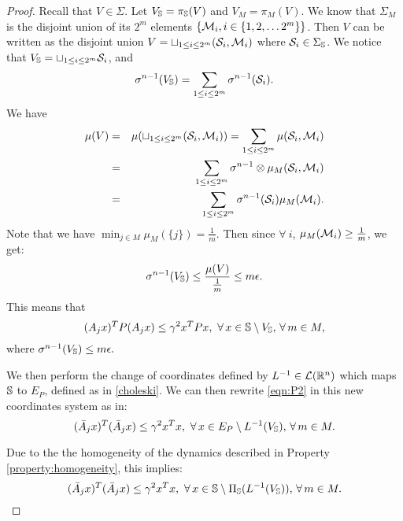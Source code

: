 \begin{proof}
Recall that $V \in \Sigma$. Let $V_{\mathbb{S}} = \pi_{\mathbb{S}}(V)$ and \mbox{$V_M = \pi_M (V)$}. We know that $\Sigma_M$ is the disjoint union of its $2^m$ elements $\{\mathcal{M}_i, i \in \{1,2, \ldots 2^m\} \}$. Then $V$ can be written as the disjoint union $V = \sqcup_{1 \leq i \leq 2^m} (\mathcal{S}_i, \mathcal{M}_i)$ where $\mathcal{S}_i \in \Sigma_{\mathbb{S}}$. We notice that 
$V_{\mathbb{S}} = \sqcup_{1 \leq i \leq 2^m} \mathcal{S}_i$, 
and
\begin{equation*}
\sigma^{n-1} (V_{\mathbb{S}}) = \sum_{1 \leq i \leq 2^m} \sigma^{n-1} (\mathcal{S}_i).
\end{equation*}
We have 
\begin{eqnarray*}
\mu(V) &=& \mu(\sqcup_{1 \leq i \leq 2^m} (\mathcal{S}_i, \mathcal{M}_i)) = \sum_{1 \leq i \leq 2^m} \mu(\mathcal{S}_i, \mathcal{M}_i) \\
 &=& \sum_{1 \leq i \leq 2^m} \sigma^{n-1} \otimes \mu_M (\mathcal{S}_i, \mathcal{M}_i) \\
 & = &\sum_{1 \leq i \leq 2^m} \sigma^{n-1}(\mathcal{S}_i) \mu_M (\mathcal{M}_i).
\end{eqnarray*}
Note that we have $\min_{j \in M} \mu_M(\{j\}) = \frac{1}{m}.$ Then since $ \forall \ i$, $\mu_M(\mathcal{M}_i) \geq \frac{1}{m}$, we get:
\begin{equation}
\sigma^{n-1}(V_{\mathbb{S}}) \leq \frac{\mu(V)}{\frac{1}{m}} \leq m \epsilon.
\end{equation}
This means that 
\begin{equation}\label{eqn:P2}(A_j x)^TP(A_j x) \leq {\gamma}^2x^TPx,\,\, \forall\, x \in \mathbb{S} \setminus V_{\mathbb{S}}, \,\forall\, m \in M,\end{equation}
where $\sigma^{n-1}(V_{\mathbb{S}}) \leq m \epsilon.$

We then perform the change of coordinates defined by $L^{-1} \in \mathcal{L}(\mathbb{R}^n)$ which maps $\mathbb{S}$ to $E_P$, defined as in \eqref{choleski}. We can then rewrite
\eqref{eqn:P2} in this new coordinates system as in: 
\begin{equation}(\bar{A}_j x)^T(\bar{A}_j x) \leq {\gamma}^2x^Tx,\,\, \forall\, x \in E_P\setminus L^{-1}(V_{\mathbb{S}}), \,\forall\, m \in M.\end{equation}

Due to the  the homogeneity of the dynamics described in Property \ref{property:homogeneity}, this implies:
\begin{equation}\label{eqn:P}(\bar{A}_j x)^T(\bar{A}_j x) \leq {\gamma}^2x^Tx,\,\, \forall\, x \in \mathbb{S}\setminus \Pi_{\mathbb{S}}(L^{-1}(V_{\mathbb{S}})), \,\forall\, m \in M.\end{equation}


\end{proof}

